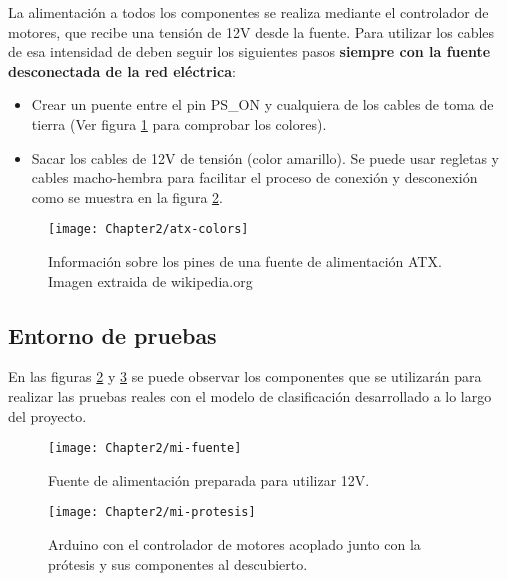 La alimentación a todos los componentes se realiza mediante el controlador de motores, que recibe una tensión de 12V desde la fuente. Para utilizar los cables de esa intensidad \cite{power-pc} de deben seguir los siguientes pasos \textbf{siempre con la fuente desconectada de la red eléctrica}:

\begin{itemize}
\item Crear un puente entre el pin PS\_ON y cualquiera de los cables de toma de tierra (Ver figura \ref{fig:atx-colors} para comprobar los colores).

\item Sacar los cables de 12V de tensión (color amarillo). Se puede usar regletas y cables macho-hembra para facilitar el proceso de conexión y desconexión como se muestra en la figura \ref{fig:mi-fuente}.

\end{itemize}

\begin{figure}[htp]
  \centering
    \texttt{[image: Chapter2/atx-colors]}
  \caption{Información sobre los pines de una fuente de alimentación ATX. Imagen extraida de wikipedia.org}
\label{fig:atx-colors}
\end{figure}



\newpage
\subsection{Entorno de pruebas}

En las figuras \ref{fig:mi-fuente} y \ref{fig:mi-prótesis} se puede observar los componentes que se utilizarán para realizar las pruebas reales con el modelo de clasificación desarrollado a lo largo del proyecto.

\begin{figure}[htp]
  \centering
    \texttt{[image: Chapter2/mi-fuente]}
  \caption{Fuente de alimentación preparada para utilizar 12V.}
\label{fig:mi-fuente}
\end{figure}

\begin{figure}[htp]
  \centering
    \texttt{[image: Chapter2/mi-protesis]}
  \caption{Arduino con el controlador de motores acoplado junto con la prótesis y sus componentes al descubierto.}
\label{fig:mi-prótesis}
\end{figure}
